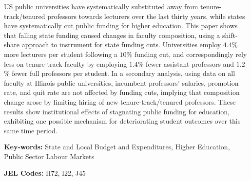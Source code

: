 US public universities have systematically substituted away from tenure-track/tenured professors towards lecturers over the last thirty years, while states have systematically cut public funding for higher education.
This paper shows that falling state funding caused changes in faculty composition, using a shift-share approach to instrument for state funding cuts.
Universities employ $4.4$\% more lecturers per student following a $10$\% funding cut, and correspondingly rely less on tenure-track faculty by employing $1.4$\% fewer assistant professors and $1.2$\% fewer full professors per student.
In a secondary analysis, using data on all faculty at Illinois public universities, incumbent professors' salaries, promotion rate, and quit rate are not affected by funding cuts, implying that composition change arose by limiting hiring of new tenure-track/tenured professors.
These results show institutional effects of stagnating public funding for education, exhibiting one possible mechanism for deteriorating student outcomes over this same time period.

\vfill
\noindent
\textbf{Key-words:}
State and Local Budget and Expenditures,
Higher Education,
Public Sector Labour Markets

\vspace{0.05cm}
\noindent
\textbf{JEL Codes:} H72, I22, J45
